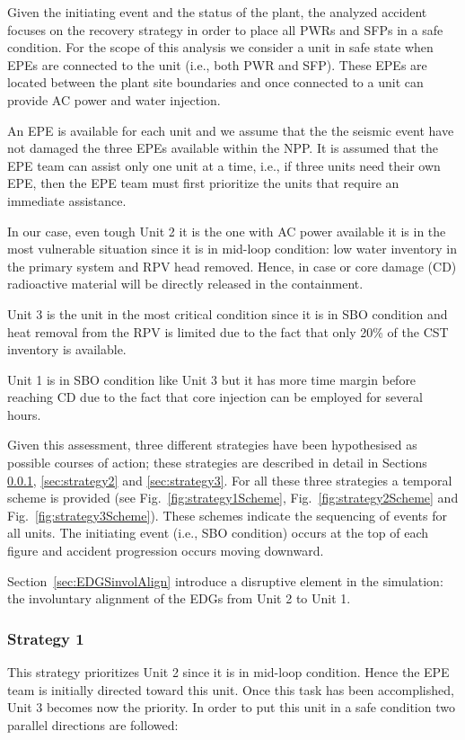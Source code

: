 Given the initiating event and the status of the plant, the analyzed accident focuses on the recovery strategy 
in order to place all PWRs and SFPs in a safe condition. For the scope of this analysis we consider a unit in
safe state when EPEs are connected to the unit (i.e., both PWR and SFP). These EPEs 
are located between the plant site boundaries and once connected to a unit can provide AC power and water injection.

An EPE is available for each unit and we assume that the the seismic event have not damaged the three EPEs available 
within the NPP. It is assumed that the EPE team can assist only one unit at a time, i.e., if three units need their 
own EPE, then the EPE team must first prioritize the units that require an immediate assistance.
  
In our case, even tough Unit 2 it is the one with AC power available it is in the most vulnerable situation since it 
is in mid-loop condition: low water inventory in the primary system and RPV head removed. Hence, in case or core damage
(CD) radioactive material will be directly released in the containment.

Unit 3 is the unit in the most critical condition since it is in SBO condition and heat removal from the RPV is limited
due to the fact that only 20\% of the CST inventory is available.

Unit 1 is in SBO condition like Unit 3 but it has more time margin before reaching CD due to the fact that core injection 
can be employed for several hours.

Given this assessment, three different strategies have been hypothesised as possible courses of action; these strategies
are described in detail in Sections \ref{sec:strategy1}, \ref{sec:strategy2} and \ref{sec:strategy3}.
For all these three strategies a temporal scheme is provided (see Fig.~\ref{fig:strategy1Scheme}, 
Fig.~\ref{fig:strategy2Scheme} and Fig.~\ref{fig:strategy3Scheme}). These schemes indicate the sequencing of events 
for all units. The initiating event (i.e., SBO condition) occurs at the top of each figure and accident progression 
occurs moving downward.

Section~\ref{sec:EDGSinvolAlign} introduce a disruptive element in the simulation: the involuntary alignment of the EDGs
from Unit 2 to Unit 1.


\subsubsection{Strategy 1}
\label{sec:strategy1}
This strategy prioritizes Unit 2 since it is in mid-loop condition. Hence the EPE team is initially directed toward
this unit. 
Once this task has been accomplished, Unit 3 becomes now the priority. In order to put this unit in a safe 
condition two parallel directions are followed:

